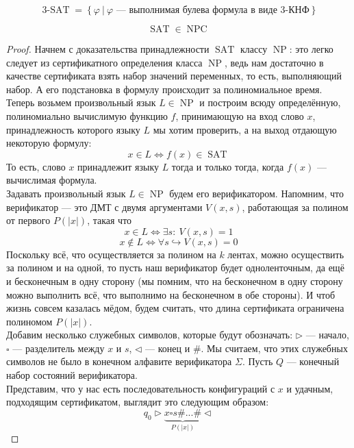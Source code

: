 \documentclass[11pt]{article}
\DeclareMathOperator{\SAT}{SAT}
\DeclareMathOperator{\tSAT}{3-SAT}
\DeclareMathOperator{\NP}{NP}
\DeclareMathOperator{\NPC}{NPC}
\begin{document}
\begin{definition}
    \[\tSAT = \left\{\varphi \ | \ \varphi \text{ --- выполнимая булева формула в виде 3-КНФ}\right\}\]
\end{definition}

\begin{theorem}
    \[\SAT \in \NPC\]
\end{theorem}

\begin{proof}
    Начнем с доказательства принадлежности $\SAT$ классу $\NP$: это легко следует из сертификатного определения класса $\NP$, ведь нам достаточно
    в качестве сертификата взять набор значений переменных, то есть, выполняющий набор. А его подстановка в формулу происходит за полиномиальное время. \\
    Теперь возьмем произвольный язык $L \in \NP$ и построим всюду определённую, полиномиально вычислимую 
    функцию $f$, принимающую на вход слово $x$, принадлежность которого языку $L$ мы хотим проверить, а на выход отдающую некоторую формулу: 
    \[x \in L \Longleftrightarrow f(x) \in \SAT\]
    То есть, слово $x$ принадлежит языку $L$ тогда и только тогда, когда $f(x)$ --- вычислимая формула. \\ Задавать произвольный язык $L \in \NP$
    будем его верификатором. Напомним, что верификатор --- это ДМТ с двумя аргументами $V(x, s)$, работающая за полином от первого $P(|x|)$, такая что 
    \[ x \in L \Longleftrightarrow \exists s: \ V(x, s) = 1\] \[x \notin L \Longleftrightarrow \forall s \hookrightarrow V(x, s) = 0\]
    Поскольку всё, что осуществляется за полином на $k$ лентах, можно осуществить за полином и на одной, то пусть наш верификатор будет одноленточным, 
    да ещё и бесконечным в одну сторону (мы помним, что на бесконечном в одну сторону можно выполнить всё, что выполнимо на бесконечном в обе стороны).
    И чтоб жизнь совсем казалась мёдом, будем считать, что длина сертификата ограничена полиномом $P(|x|)$. \\ 
    Добавим несколько служебных символов, которые будут обозначать: $\rhd$ --- начало, $\square$ --- разделитель между $x$ и $s$, $\lhd$ --- конец и $\#$.
    Мы считаем, что этих служебных символов не было в конечном алфавите верификатора $\Sigma$. Пусть $Q$ --- конечный набор состояний верификатора. \\
    Представим, что у нас есть последовательность конфигураций с $x$ и удачным, подходящим сертификатом, выглядит это следующим образом:
    \[q_0 \rhd \underbrace{x \square s \# ... \#}_{P(|x|)} \lhd\]

\end{proof}
\end{document}
